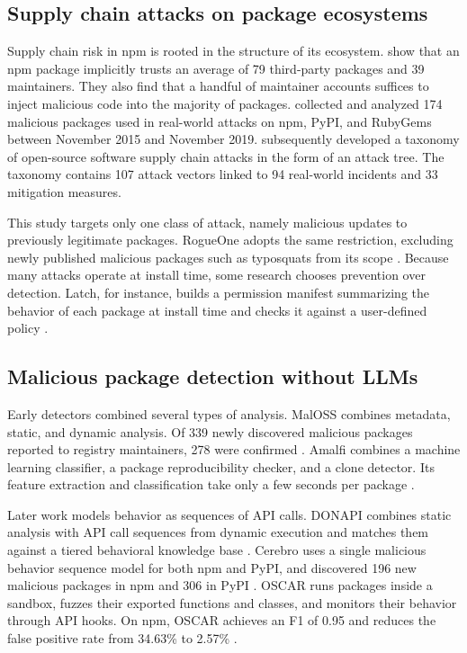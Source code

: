 \documentclass[a4paper,fleqn]{cas-dc}
\begin{document}
\subsection{Supply chain attacks on package ecosystems}

Supply chain risk in npm is rooted in the structure of its ecosystem.
\citet{zimmermann2019small} show that an npm package implicitly trusts an average
of 79 third-party packages and 39 maintainers. They also find that a handful of
maintainer accounts suffices to inject malicious code into the majority of
packages. \citet{ohm2020backstabber} collected and analyzed 174 malicious
packages used in real-world attacks on npm, PyPI, and RubyGems between November
2015 and November 2019. \citet{ladisa2023sok} subsequently developed a taxonomy
of open-source software supply chain attacks in the form of an attack tree. The
taxonomy contains 107 attack vectors linked to 94 real-world incidents and 33
mitigation measures.

This study targets only one class of attack, namely malicious updates to
previously legitimate packages. RogueOne adopts the same restriction, excluding
newly published malicious packages such as typosquats from its scope
\citep{sofaer2024rogueone}. Because many attacks operate at install time, some
research chooses prevention over detection. Latch, for instance, builds a
permission manifest summarizing the behavior of each package at install time and
checks it against a user-defined policy \citep{wyss2022wolf}.

\subsection{Malicious package detection without LLMs}

Early detectors combined several types of analysis. MalOSS combines metadata,
static, and dynamic analysis. Of 339 newly discovered malicious packages reported
to registry maintainers, 278 were confirmed \citep{duan2021towards}. Amalfi
combines a machine learning classifier, a package reproducibility checker, and a
clone detector. Its feature extraction and classification take only a few seconds
per package \citep{sejfia2022practical}.

Later work models behavior as sequences of API calls. DONAPI combines static
analysis with API call sequences from dynamic execution and matches them against
a tiered behavioral knowledge base \citep{huang2024donapi}. Cerebro uses a single
malicious behavior sequence model for both npm and PyPI, and discovered 196 new
malicious packages in npm and 306 in PyPI \citep{zhang2025killing}. OSCAR runs
packages inside a sandbox, fuzzes their exported functions and classes, and
monitors their behavior through API hooks. On npm, OSCAR achieves an F1 of 0.95
and reduces the false positive rate from 34.63\% to 2.57\%
\citep{zheng2024towards}.
\end{document}
